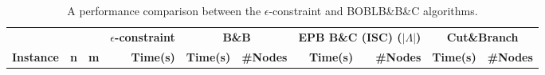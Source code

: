 \begin{center}
\begin{scriptsize}
    
\begin{longtable}{lrrrrrrrrr}
\caption{A performance comparison between the $\epsilon$-constraint and BOBLB\&B\&C algorithms.} \\

\toprule
~& ~& ~ & \textbf{\tiny{$\epsilon$-constraint}}  & \multicolumn{2}{c}{\textbf{B\&B}} & \multicolumn{2}{c}{\textbf{EPB B\&C (ISC) ($|\Lambda|$)}} &  \multicolumn{2}{c}{\textbf{Cut\&Branch}} 
\\
\cmidrule(r){4-4} \cmidrule(r){5-6} \cmidrule(r){7-8} \cmidrule(r){9-10} 
\textbf{Instance} & \textbf{n} & \textbf{m}  &\textbf{Time(s)}  & \textbf{Time(s)} &\textbf{\#Nodes} & \textbf{Time(s)} &\textbf{\#Nodes}& \textbf{Time(s)} &\textbf{\#Nodes} \\
\midrule

\endfirsthead
    

\end{longtable}
\end{scriptsize}
\end{center}

